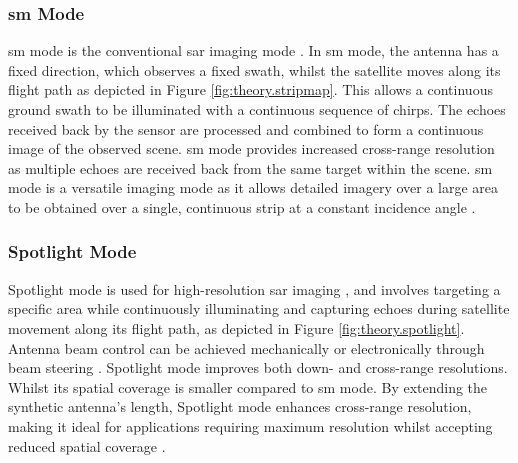 
\subsubsection{\acf{sm} Mode}

\acs{sm} mode is the conventional \acs{sar} imaging mode \cite{Frery2022}. In \acs{sm} mode, the antenna has a fixed direction, which observes a fixed swath, whilst the satellite moves along its flight path \cite{Moreira2013} as depicted in Figure \ref{fig:theory.stripmap}. This allows a continuous ground swath to be illuminated with a continuous sequence of chirps. The echoes received back by the sensor are processed and combined to form a continuous image of the observed scene. \acs{sm} mode provides increased cross-range resolution as multiple echoes are received back from the same target within the scene. \acs{sm} mode is a versatile imaging mode as it allows detailed imagery over a large area to be obtained over a single, continuous strip at a constant incidence angle \cite{Moreira2013,Frery2022,sentinel1ProductDef}.



\subsubsection{Spotlight Mode}

Spotlight mode is used for high-resolution \acs{sar} imaging \cite{Meyer2019}, and involves targeting a specific area while continuously illuminating and capturing echoes during satellite movement along its flight path, as depicted in Figure \ref{fig:theory.spotlight}. Antenna beam control can be achieved mechanically or electronically through beam steering \cite{Frery2022}. Spotlight mode improves both down- and cross-range resolutions. Whilst its spatial coverage is smaller compared to \acs{sm} mode. By extending the synthetic antenna's length, Spotlight mode enhances cross-range resolution, making it ideal for applications requiring maximum resolution whilst accepting reduced spatial coverage \cite{Moreira2013}.

